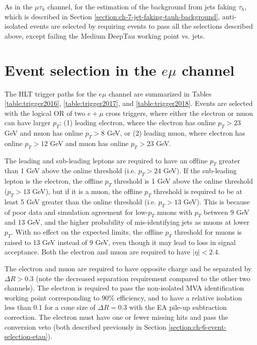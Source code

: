 As in the $\mu\tau_{h}$ channel, for the estimation of the background from jets faking $\tau_{h}$, which is described in Section \ref{section:ch-7-jet-faking-tauh-background}, anti-isolated events are selected by requiring events to pass all the selections described above, except failing the Medium DeepTau working point vs. jets.

\section{Event selection in the \texorpdfstring{$e\mu$}{emu} channel}
\label{section:ch-6-event-selection-emu}

The HLT trigger paths for the $e\mu$ channel are summarized in Tables \ref{table:trigger2016}, \ref{table:trigger2017}, and \ref{table:trigger2018}. Events are selected with the logical OR of two $e+\mu$ cross triggers, where either the electron or muon can have larger $p_{T}$: (1) leading electron, where the electron has online $p_{T} > 23$ GeV and muon has online $p_{T} > 8$ GeV, or (2) leading muon, where electron has online $p_{T} > 12$ GeV and muon has online $p_{T}>23$ GeV.

The leading and sub-leading leptons are required to have an offline $p_{T}$ greater than 1 GeV above the online threshold (i.e. $p_{T} > 24$ GeV). If the sub-leading lepton is the electron, the offline $p_{T}$ threshold is 1 GeV above the online threshold ($p_{T} > 13$ GeV), but if it is a muon, the offline $p_{T}$ threshold is required to be at least 5 GeV greater than the online threshold (i.e. $p_T > 13$ GeV). This is because of poor data and simulation agreement for low-$p_T$ muons with $p_T$ between 9 GeV and 13 GeV, and the higher probability of mis-identifying jets as muons at lower $p_{T}$. With no effect on the expected limits, the offline $p_{T}$ threshold for muons is raised to 13 GeV instead of 9 GeV, even though it may lead to loss in signal acceptance. Both the electron and muon are required to have $|\eta| < 2.4$.

The electron and muon are required to have opposite charge and be separated by $\Delta R > 0.3$ (note the decreased separation requirement compared to the other two channels). The electron is required to pass the non-isolated MVA identification working point corresponding to 90\% efficiency, and to have a relative isolation less than 0.1 for a cone size of $\Delta R = 0.3$ with the EA pile-up subtraction correction. The electron must have one or fewer missing hits and pass the conversion veto (both described previously in Section \ref{section:ch-6-event-selection-etau}). 

